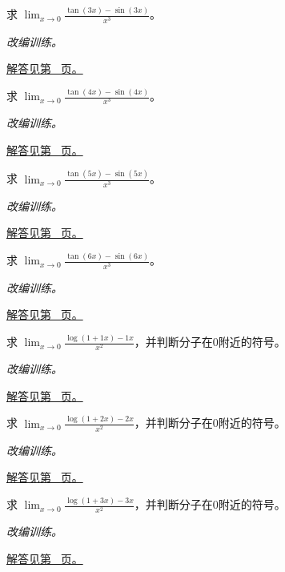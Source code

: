 \documentclass[12pt,fontset=fandol]{ctexart}
\begin{document}
\begin{example}[三角函数差的三阶项]\label{ex:c5q15}
求 $\displaystyle\lim_{x\to0}\frac{\tan(3x)-\sin(3x)}{x^3}$。
\par\textit{改编训练。}\par\hyperref[ans:c5q15]{解答见第~\pageref{ans:c5q15} 页。}
\end{example}
\begin{example}[三角函数差的三阶项]\label{ex:c5q16}
求 $\displaystyle\lim_{x\to0}\frac{\tan(4x)-\sin(4x)}{x^3}$。
\par\textit{改编训练。}\par\hyperref[ans:c5q16]{解答见第~\pageref{ans:c5q16} 页。}
\end{example}
\begin{example}[三角函数差的三阶项]\label{ex:c5q17}
求 $\displaystyle\lim_{x\to0}\frac{\tan(5x)-\sin(5x)}{x^3}$。
\par\textit{改编训练。}\par\hyperref[ans:c5q17]{解答见第~\pageref{ans:c5q17} 页。}
\end{example}
\begin{example}[三角函数差的三阶项]\label{ex:c5q18}
求 $\displaystyle\lim_{x\to0}\frac{\tan(6x)-\sin(6x)}{x^3}$。
\par\textit{改编训练。}\par\hyperref[ans:c5q18]{解答见第~\pageref{ans:c5q18} 页。}
\end{example}
\begin{example}[对数减去线性项]\label{ex:c5q19}
求 $\displaystyle\lim_{x\to0}\frac{\log(1+1x)-1x}{x^2}$，并判断分子在0附近的符号。
\par\textit{改编训练。}\par\hyperref[ans:c5q19]{解答见第~\pageref{ans:c5q19} 页。}
\end{example}
\begin{example}[对数减去线性项]\label{ex:c5q20}
求 $\displaystyle\lim_{x\to0}\frac{\log(1+2x)-2x}{x^2}$，并判断分子在0附近的符号。
\par\textit{改编训练。}\par\hyperref[ans:c5q20]{解答见第~\pageref{ans:c5q20} 页。}
\end{example}
\begin{example}[对数减去线性项]\label{ex:c5q21}
求 $\displaystyle\lim_{x\to0}\frac{\log(1+3x)-3x}{x^2}$，并判断分子在0附近的符号。
\par\textit{改编训练。}\par\hyperref[ans:c5q21]{解答见第~\pageref{ans:c5q21} 页。}
\end{example}
\end{document}
